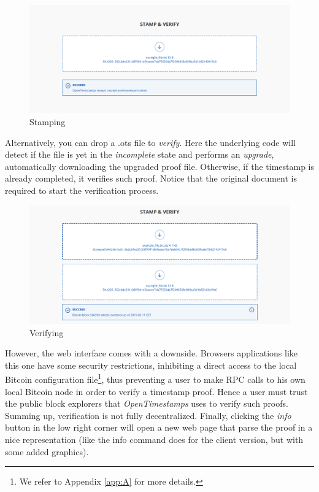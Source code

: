 \bigskip
\begin{figure}[htbp]
    \centering
	\includegraphics[width=1\linewidth]{Images/stamping.png}
	\caption{Stamping}
	\label{fig:ots-stamping}
\end{figure}

\newpage
\noindent
Alternatively, you can drop a \colorbox{light-gray}{.ots} file to \textit{verify}. Here the underlying code will detect if the file is yet in the \textit{incomplete} state and performs an \textit{upgrade}, automatically downloading the upgraded proof file. Otherwise, if the timestamp is already completed, it verifies such proof. Notice that the original document is required to start the verification process.

\bigskip
\begin{figure}[htbp]
    \centering
	\includegraphics[width=1\linewidth]{Images/verify.png}
	\caption{Verifying}
	\label{fig:ots-verifying}
\end{figure}

\bigskip
\noindent
However, the web interface comes with a downside. Browsers applications like this one have some security restrictions, inhibiting a direct access to the local Bitcoin configuration file\footnote{We refer to Appendix \ref{app:A} for more details.}, thus preventing a user to make RPC calls to his own local Bitcoin node in order to verify a timestamp proof. Hence a user must trust the public block explorers that \textit{OpenTimestamps} uses to verify such proofs. Summing up, verification is not fully decentralized. Finally, clicking the \textit{info} button in the low right corner will open a new web page that parse the proof in a nice representation (like the \colorbox{light-gray}{info} command does for the client version, but with some added graphics).





